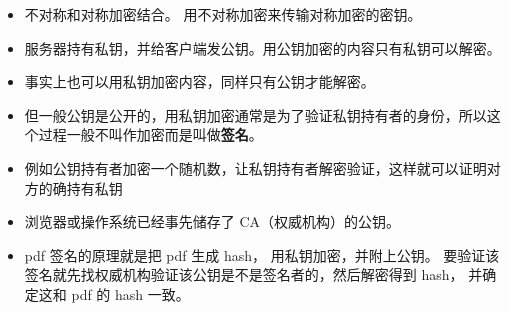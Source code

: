 
\begin{itemize}
\item 不对称和对称加密结合。 用不对称加密来传输对称加密的密钥。
\item 服务器持有私钥，并给客户端发公钥。用公钥加密的内容只有私钥可以解密。
\item 事实上也可以用私钥加密内容，同样只有公钥才能解密。
\item 但一般公钥是公开的，用私钥加密通常是为了验证私钥持有者的身份，所以这个过程一般不叫作加密而是叫做\textbf{签名}。
\item 例如公钥持有者加密一个随机数，让私钥持有者解密验证，这样就可以证明对方的确持有私钥
\item 浏览器或操作系统已经事先储存了 CA（权威机构）的公钥。

\item pdf 签名的原理就是把 pdf 生成 hash， 用私钥加密，并附上公钥。 要验证该签名就先找权威机构验证该公钥是不是签名者的，然后解密得到 hash， 并确定这和 pdf 的 hash 一致。
\end{itemize}

